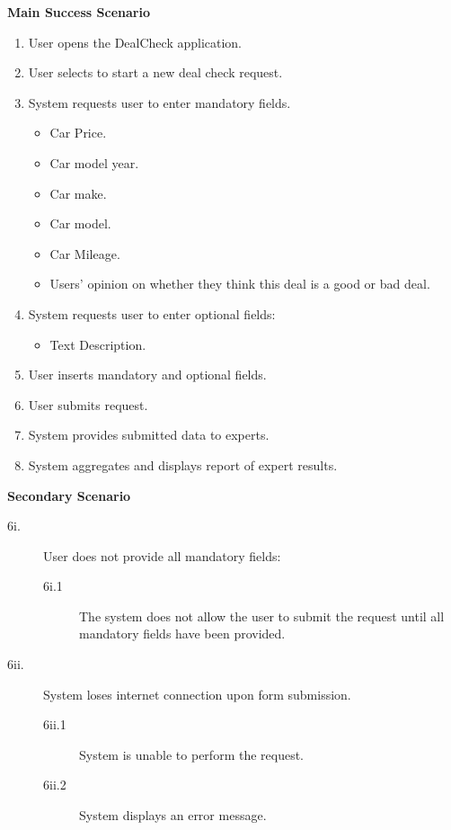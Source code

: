 \documentclass[]{article}
\begin{document}
\begin{enumerate}[{\bf {BE}1.}]
    {\bf Main Success Scenario}
        \begin{enumerate}[1.]
            \item User opens the DealCheck application.
            \item User selects to start a new deal check request.
            \item System requests user to enter mandatory fields.
            \begin{itemize}
                \item Car Price.
                \item Car model year.
                \item Car make.
                \item Car model.
                \item Car Mileage.
                \item Users' opinion on whether they think this deal is a good or bad deal.
            \end{itemize}
            \item System requests user to enter optional fields:
            \begin{itemize}
                \item Text Description.
            \end{itemize}
            \item User inserts mandatory and optional fields.
            \item User submits request.
            \item System provides submitted data to experts.
            \item System aggregates and displays report of expert results.
        \end{enumerate}
        
        {\bf Secondary Scenario} \\
        \begin{description}
			\item [6i.] User does not provide all mandatory fields:
			\begin{description}
				\item [6i.1] The system does not allow the user to submit the request until all mandatory fields have been provided.
			\end{description}
		
			\item [6ii.] System loses internet connection upon form submission.
			\begin{description}
				\item [6ii.1] System is unable to perform the request.
				\item [6ii.2] System displays an error message.
			\end{description}
		

\end{description}
\end{enumerate}
\end{document}
